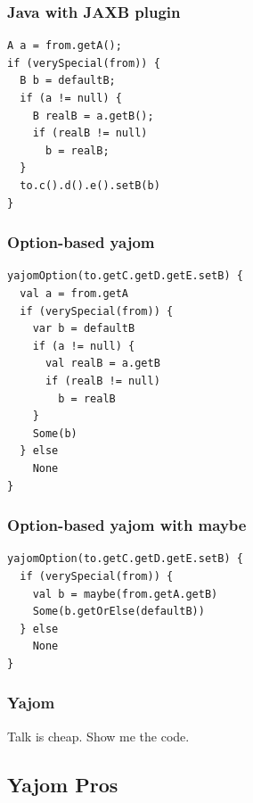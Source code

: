 \documentclass[14pt]{beamer}
\begin{document}
\begin{frame}[fragile]
\frametitle{Java with JAXB plugin}
\begin{lstlisting}
A a = from.getA();
if (verySpecial(from)) {
  B b = defaultB;
  if (a != null) {
    B realB = a.getB();
    if (realB != null)
      b = realB; 
  } 
  to.c().d().e().setB(b)
}
\end{lstlisting}
\end{frame}

\begin{frame}[fragile]
\frametitle{Option-based yajom}
\begin{lstlisting}
yajomOption(to.getC.getD.getE.setB) {
  val a = from.getA
  if (verySpecial(from)) {
    var b = defaultB
    if (a != null) {
      val realB = a.getB
      if (realB != null)
        b = realB
    }
    Some(b)
  } else
    None
}
\end{lstlisting}
\end{frame}

\begin{frame}[fragile]
\frametitle{Option-based yajom with maybe}
\begin{lstlisting}
yajomOption(to.getC.getD.getE.setB) {
  if (verySpecial(from)) {
    val b = maybe(from.getA.getB)
    Some(b.getOrElse(defaultB))
  } else
    None
}
\end{lstlisting}
\end{frame}

\frame
{\frametitle{Yajom}
\begin{center}
  \large Talk is cheap. Show me the code.
\end{center}
}

\subsection{Yajom Pros}
\end{document}
